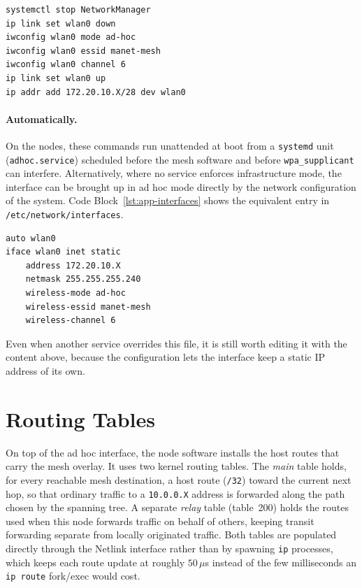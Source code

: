 \begin{lstlisting}[language=bash,caption={Setting up the ad hoc network manually},label=lst:app-manual]
systemctl stop NetworkManager
ip link set wlan0 down
iwconfig wlan0 mode ad-hoc
iwconfig wlan0 essid manet-mesh
iwconfig wlan0 channel 6
ip link set wlan0 up
ip addr add 172.20.10.X/28 dev wlan0
\end{lstlisting}

\paragraph{Automatically.} On the nodes, these commands run unattended at boot
from a \texttt{systemd} unit (\texttt{adhoc.service}) scheduled before the mesh
software and before \texttt{wpa\_supplicant} can interfere. Alternatively, where
no service enforces infrastructure mode, the interface can be brought up in ad
hoc mode directly by the network configuration of the system. Code
Block~\ref{lst:app-interfaces} shows the equivalent entry in
\texttt{/etc/network/interfaces}.

\begin{lstlisting}[language=bash,caption={Static ad hoc configuration in the interfaces file (X is the node ID)},label=lst:app-interfaces]
auto wlan0
iface wlan0 inet static
    address 172.20.10.X
    netmask 255.255.255.240
    wireless-mode ad-hoc
    wireless-essid manet-mesh
    wireless-channel 6
\end{lstlisting}

Even when another service overrides this file, it is still worth editing it with
the content above, because the configuration lets the interface keep a static IP
address of its own.

\section{Routing Tables}
\label{sec:app-routing}

On top of the ad hoc interface, the node software installs the host routes that
carry the mesh overlay. It uses two kernel routing tables. The \emph{main} table
holds, for every reachable mesh destination, a host route (\texttt{/32}) toward
the current next hop, so that ordinary traffic to a \texttt{10.0.0.X} address is
forwarded along the path chosen by the spanning tree. A separate \emph{relay}
table (table~200) holds the routes used when this node forwards traffic on behalf
of others, keeping transit forwarding separate from locally originated traffic.
Both tables are populated directly through the Netlink interface rather than by
spawning \texttt{ip} processes, which keeps each route update at roughly
$50\,\mu$s instead of the few milliseconds an \texttt{ip route}
fork/exec would cost.

